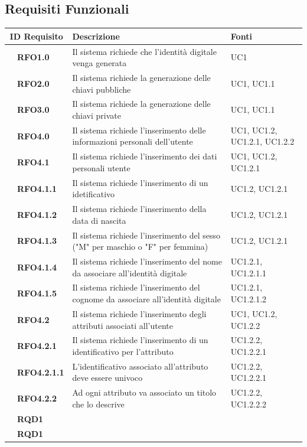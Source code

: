 \subsection{Requisiti Funzionali}
\begin{longtable}{|r l|p{10cm}|p{2cm}|}
	\hline
	\multicolumn{2}{|c|}{\textbf{ID Requisito}} & \textbf{Descrizione} & \textbf{Fonti}\tabularnewline
	\hline
	&\textbf{RFO1.0}&Il sistema richiede che l'identità digitale venga generata&UC1 \\\hline
	&\textbf{RFO2.0}&Il sistema richiede la generazione delle chiavi pubbliche&UC1, UC1.1 \\\hline
	&\textbf{RFO3.0}&Il sistema richiede la generazione delle chiavi private&UC1, UC1.1 \\\hline
	&\textbf{RFO4.0}&Il sistema richiede l'inserimento delle informazioni personali dell'utente&UC1, UC1.2, UC1.2.1, UC1.2.2 \\\hline
	&\textbf{RFO4.1}&Il sistema richiede l'inserimento dei dati personali utente&UC1, UC1.2, UC1.2.1 \\\hline
	&\textbf{RFO4.1.1}&Il sistema richiede l'inserimento di un idetificativo&UC1.2, UC1.2.1 \\\hline
	&\textbf{RFO4.1.2}&Il sistema richiede l'inserimento della data di nascita&UC1.2, UC1.2.1 \\\hline
	&\textbf{RFO4.1.3}&Il sistema richiede l'inserimento del sesso ("M" per maschio o "F" per femmina)&UC1.2, UC1.2.1\\\hline
	&\textbf{RFO4.1.4}&Il sistema richiede l'inserimento del nome da associare all'identità digitale&UC1.2.1, UC1.2.1.1\\\hline
	&\textbf{RFO4.1.5}&Il sistema richiede l'inserimento del cognome da associare all'identità digitale&UC1.2.1, UC1.2.1.2\\\hline
	&\textbf{RFO4.2}&Il sistema richiede l'inserimento degli attributi associati all'utente&UC1, UC1.2, UC1.2.2 \\\hline
	&\textbf{RFO4.2.1}&Il sistema richiede l'inserimento di un identificativo per l'attributo&UC1.2.2, UC1.2.2.1 \\\hline
	&\textbf{RFO4.2.1.1}& L'identificativo associato all'attributo deve essere univoco&UC1.2.2, UC1.2.2.1 \\\hline
	&\textbf{RFO4.2.2}&Ad ogni attributo va associato un titolo che lo descrive&UC1.2.2, UC1.2.2.2 \\\hline
	&\textbf{RQD1}& & \\\hline
	&\textbf{RQD1}& & \\\hline

\end{longtable}
